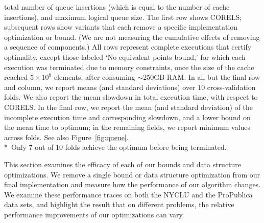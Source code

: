 \documentclass[twoside,11pt]{article}
\begin{document}
\begin{table}[t!]
{total number of queue insertions (which is equal to the number of cache insertions),
and maximum logical queue size.
%
The first row shows CORELS; subsequent rows show variants
that each remove a specific implementation optimization or bound.
%
(We are not measuring the cumulative effects of removing a sequence of components.)
%
All rows represent complete executions that certify optimality,
except those labeled `No equivalent points bound,'
for which each execution was terminated due to memory constraints,
once the size of the cache reached ${5 \times 10^8}$ elements,
after consuming $\sim$250GB RAM.
%
In all but the final row and column, we report means
(and standard deviations) over 10 cross-validation folds.
%
We also report the  mean slowdown in total execution time,
with respect to CORELS.
%
In the final row, we report the mean (and standard deviation) of the
incomplete execution time and corresponding slowdown,
and a lower bound on the mean time to optimum;
in the remaining fields, we report minimum values across folds.
%
See also Figure~\ref{fig:queue}. \\
%
*~Only 7 out of 10 folds achieve the optimum before being terminated.
}
\vspace{4mm}
\label{tab:ablation}
\end{table}

This section examines the efficacy of each of our bounds and data structure optimizations.
%
We remove a single bound or data structure optimization from our final implementation and measure
how the performance of our algorithm changes.
%
We examine these performance traces on both the NYCLU and the ProPublica data sets,
and highlight the result that on different problems, the relative performance improvements
of our optimizations can vary.
\end{document}
